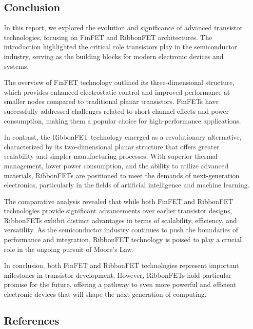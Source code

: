 \documentclass[12pt]{report}
\begin{document}
\begin{titlepage}
\chapter{Conclusion}

In this report, we explored the evolution and significance of advanced transistor technologies, focusing on FinFET and RibbonFET architectures. The introduction highlighted the critical role transistors play in the semiconductor industry, serving as the building blocks for modern electronic devices and systems.

The overview of FinFET technology outlined its three-dimensional structure, which provides enhanced electrostatic control and improved performance at smaller nodes compared to traditional planar transistors. FinFETs have successfully addressed challenges related to short-channel effects and power consumption, making them a popular choice for high-performance applications.

In contrast, the RibbonFET technology emerged as a revolutionary alternative, characterized by its two-dimensional planar structure that offers greater scalability and simpler manufacturing processes. With superior thermal management, lower power consumption, and the ability to utilize advanced materials, RibbonFETs are positioned to meet the demands of next-generation electronics, particularly in the fields of artificial intelligence and machine learning.

The comparative analysis revealed that while both FinFET and RibbonFET technologies provide significant advancements over earlier transistor designs, RibbonFETs exhibit distinct advantages in terms of scalability, efficiency, and versatility. As the semiconductor industry continues to push the boundaries of performance and integration, RibbonFET technology is poised to play a crucial role in the ongoing pursuit of Moore's Law.

In conclusion, both FinFET and RibbonFET technologies represent important milestones in transistor development. However, RibbonFETs hold particular promise for the future, offering a pathway to even more powerful and efficient electronic devices that will shape the next generation of computing.
\vspace{1.5in}
\section*{References}


\end{titlepage}
\end{document}
